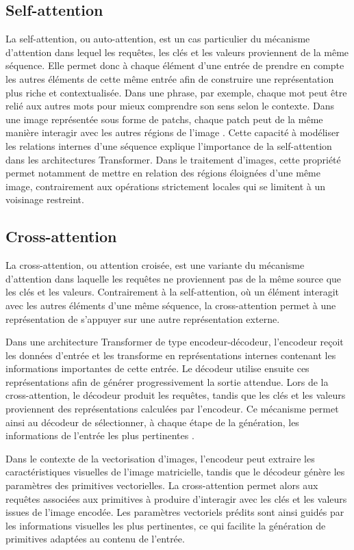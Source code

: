 \documentclass[12pt, a4paper, oneside]{report}
\begin{document}
\subsection{Self-attention}
La self-attention, ou auto-attention, est un cas particulier du mécanisme d'attention dans lequel les requêtes, les clés et les valeurs proviennent de la même séquence. Elle permet donc à chaque élément d'une entrée de prendre en compte les autres éléments de cette même entrée afin de construire une représentation plus riche et contextualisée. Dans une phrase, par exemple, chaque mot peut être relié aux autres mots pour mieux comprendre son sens selon le contexte. Dans une image représentée sous forme de patchs, chaque patch peut de la même manière interagir avec les autres régions de l'image \cite{vaswani2017attention}. Cette capacité à modéliser les relations internes d'une séquence explique l'importance de la self-attention dans les architectures Transformer. Dans le traitement d'images, cette propriété permet notamment de mettre en relation des régions éloignées d'une même image, contrairement aux opérations strictement locales qui se limitent à un voisinage restreint.

\subsection{Cross-attention}
\label{sec:cross_attention}

La cross-attention, ou attention croisée, est une variante du mécanisme d'attention dans laquelle les requêtes ne proviennent pas de la même source que les clés et les valeurs. Contrairement à la self-attention, où un élément interagit avec les autres éléments d'une même séquence, la cross-attention permet à une représentation de s'appuyer sur une autre représentation externe.

Dans une architecture Transformer de type encodeur-décodeur, l'encodeur reçoit les données d'entrée et les transforme en représentations internes contenant les informations importantes de cette entrée. Le décodeur utilise ensuite ces représentations afin de générer progressivement la sortie attendue. Lors de la cross-attention, le décodeur produit les requêtes, tandis que les clés et les valeurs proviennent des représentations calculées par l'encodeur. Ce mécanisme permet ainsi au décodeur de sélectionner, à chaque étape de la génération, les informations de l'entrée les plus pertinentes \cite{vaswani2017attention,geron2022hands}.

Dans le contexte de la vectorisation d'images, l'encodeur peut extraire les caractéristiques visuelles de l'image matricielle, tandis que le décodeur génère les paramètres des primitives vectorielles. La cross-attention permet alors aux requêtes associées aux primitives à produire d'interagir avec les clés et les valeurs issues de l'image encodée. Les paramètres vectoriels prédits sont ainsi guidés par les informations visuelles les plus pertinentes, ce qui facilite la génération de primitives adaptées au contenu de l'entrée.
\end{document}
